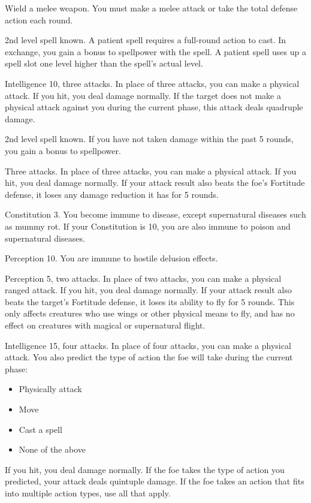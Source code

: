 \stylereq Wield a melee weapon.
You must make a melee attack or take the total defense action each round.

\featpre 2nd level spell known.
\featben A patient spell requires a full-round action to cast.
In exchange, you gain a  bonus to spellpower with the spell.
A patient spell uses up a spell slot one level higher than the spell's actual level.

\featpre Intelligence 10, three attacks.
\featben In place of three attacks, you can make a physical attack.
If you hit, you deal damage normally.
If the target does not make a physical attack against you during the current phase, this attack deals quadruple damage.

\featpre 2nd level spell known.
\featben If you have not taken damage within the past 5 rounds, you gain a  bonus to spellpower.

\featpre Three attacks.
\featben In place of three attacks, you can make a physical attack.
If you hit, you deal damage normally.
If your attack result also beats the foe's Fortitude defense, it loses any damage reduction it has for 5 rounds.

\featpre Constitution 3.
\featben You become immune to disease, except supernatural diseases such as mummy rot.
If your Constitution is 10, you are also immune to poison and supernatural diseases.

\featpre Perception 10.
\featben You are immune to hostile delusion effects.

\featpre Perception 5, two attacks.
\featben In place of two attacks, you can make a physical ranged attack.
If you hit, you deal damage normally.
If your attack result also beats the target's Fortitude defense, it loses its ability to fly for 5 rounds.
This only affects creatures who use wings or other physical means to fly, and has no effect on creatures with magical or supernatural flight.

\featpre Intelligence 15, four attacks.
\featben In place of four attacks, you can make a physical attack.
You also predict the type of action the foe will take during the current phase:
\begin{itemize}
    \item Physically attack
    \item Move
    \item Cast a spell
    \item None of the above
\end{itemize}
If you hit, you deal damage normally.
If the foe takes the type of action you predicted, your attack deals quintuple damage.
If the foe takes an action that fits into multiple action types, use all that apply.

